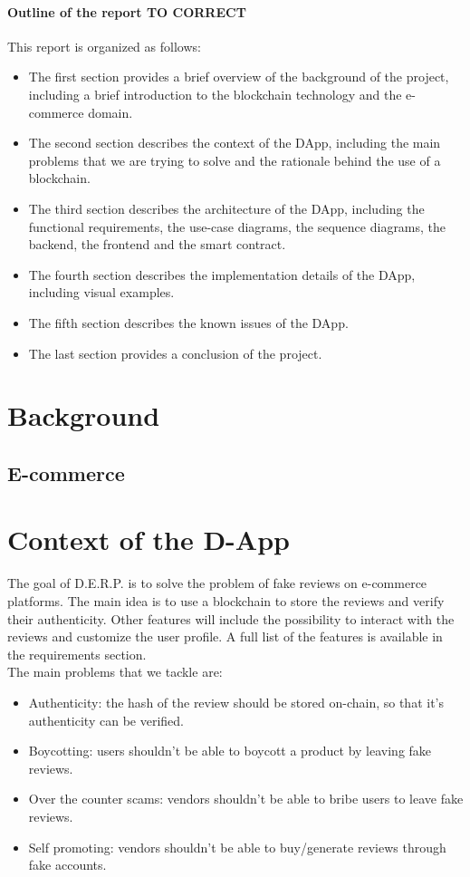 \documentclass[12pt,a4paper,oneside]{article}
\theoremstyle{definition}
\begin{document}
\paragraph{Outline of the report TO CORRECT} This report is organized as follows:
\begin{itemize}
	\item The first section provides a brief overview of the background of the project, including a brief introduction to the blockchain technology and the e-commerce domain.
	\item The second section describes the context of the DApp, including the main problems that we are trying to solve and the rationale behind the use of a blockchain.
	\item The third section describes the architecture of the DApp, including the functional requirements, the use-case diagrams, the sequence diagrams, the backend, the frontend and the smart contract.
	\item The fourth section describes the implementation details of the DApp, including visual examples.
	\item The fifth section describes the known issues of the DApp.
	\item The last section provides a conclusion of the project.
\end{itemize}

\section{Background}

\subsection{E-commerce}

\section{Context of the D-App}
The goal of D.E.R.P. is to solve the problem of fake reviews on e-commerce platforms. The main idea is to use a blockchain to store the reviews and verify their authenticity. Other features will include the possibility to interact with the reviews and customize the user profile. A full list of the features is available in the requirements section. \\
The main problems that we tackle are:
\begin{itemize}
	\item Authenticity: the hash of the review should be stored on-chain, so that it's authenticity can be verified.
	\item Boycotting: users shouldn't be able to boycott a product by leaving fake reviews.
	\item Over the counter scams: vendors shouldn't be able to bribe users to leave fake reviews.
	\item Self promoting: vendors shouldn't be able to buy/generate reviews through fake accounts.
\end{itemize}
\end{document}
